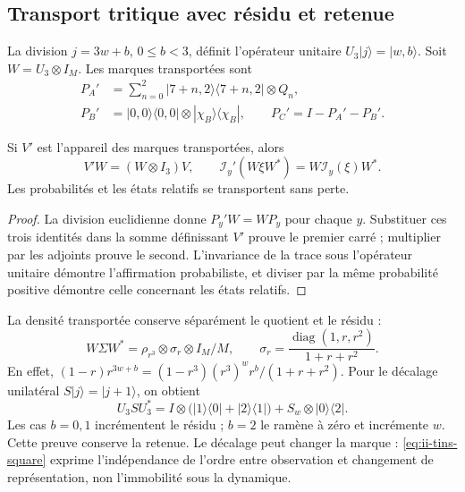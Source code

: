 \subsection{Transport tritique avec résidu et retenue}
\label{subsec:ii-tins-tritico}

La division $j=3w+b$, $0\le b<3$, définit l’opérateur unitaire
$U_3|j\rangle=|w,b\rangle$. Soit $W=U_3\otimes I_M$. Les marques transportées sont
\begin{align}
 P_A'&=\sum_{n=0}^2|7+n,2\rangle\langle7+n,2|\otimes Q_n,\nonumber\\
 P_B'&=|0,0\rangle\langle0,0|\otimes|\chi_B\rangle\langle \chi_B|,
 \qquad P_C'=I-P_A'-P_B'.
 \label{eq:ii-tins-tritic-marks}
\end{align}

\begin{proposition}
\label{prop:ii-tins-tritic}
Si $V'$ est l’appareil des marques transportées, alors
\begin{equation}
 V'W=(W\otimes I_3)V,\qquad
 \mathcal I_y'(W\xi W^*)=W\mathcal I_y(\xi)W^*.
 \label{eq:ii-tins-square}
\end{equation}
Les probabilités et les états relatifs se transportent sans perte.
\end{proposition}
\begin{proof}
La division euclidienne donne $P_y'W=WP_y$ pour chaque $y$. Substituer ces
trois identités dans la somme définissant $V'$ prouve le premier carré ;
multiplier par les adjoints prouve le second. L’invariance de la trace
sous l’opérateur unitaire démontre l’affirmation probabiliste, et diviser par
la même probabilité positive démontre celle concernant les états relatifs.
\end{proof}

La densité transportée conserve séparément le quotient et le résidu :
\begin{equation}
 W\Sigma W^*=\rho_{r^3}\otimes\sigma_r\otimes I_M/M,
 \qquad \sigma_r=\frac{\operatorname{diag}(1,r,r^2)}{1+r+r^2}.
 \label{eq:ii-tins-tritic-state}
\end{equation}
En effet, $(1-r)r^{3w+b}=(1-r^3)(r^3)^w r^b/(1+r+r^2)$.
Pour le décalage unilatéral $S|j\rangle=|j+1\rangle$, on obtient
\begin{equation}
 U_3SU_3^*=I\otimes\bigl(|1\rangle\langle0|+|2\rangle\langle1|\bigr)
 +S_w\otimes|0\rangle\langle2|.
 \label{eq:ii-tins-carry}
\end{equation}
Les cas $b=0,1$ incrémentent le résidu ; $b=2$ le ramène à zéro et
incrémente $w$. Cette preuve conserve la retenue. Le décalage peut
changer la marque : \eqref{eq:ii-tins-square} exprime l’indépendance de l’ordre
entre observation et changement de représentation, non l’immobilité sous la dynamique.

